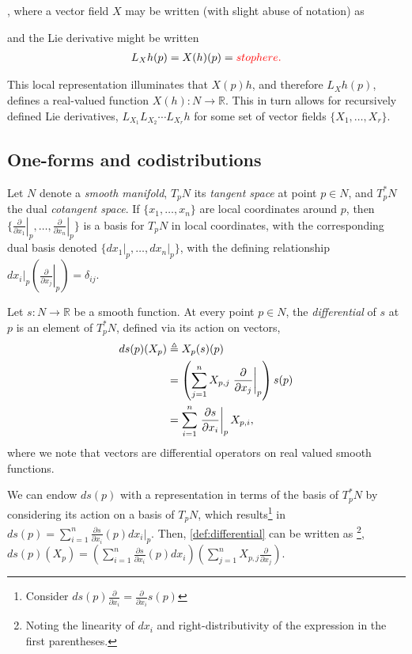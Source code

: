 \documentclass[psamsfonts]{amsart}
\theoremstyle{definition}
\theoremstyle{remark}
\newcommand*\R{\mathds{R}}
\newcommand*\isdefined{\triangleq}
\newcommand{\fracpartial}[2]{\frac{\partial #1}{\partial  #2}}
\numberwithin{equation}{section}
\begin{document}
, where a vector field $X$ may be written (with slight abuse of notation) as

 and the Lie derivative might be written 
\begin{align}
L_Xh(p) = X(h)(p) = {\color{red} stop here. }
\end{align}

This local representation illuminates that $X(p)h$, and therefore $L_Xh(p)$, defines a real-valued function $X(h):N\rightarrow \R$. This in turn allows for recursively defined Lie derivatives, $L_{X_{1}}L_{X_{2}}\cdots L_{X_{r}}h$ for some set of vector fields $\{X_1, \dots , X_r\}$.


\subsection{One-forms and codistributions}
Let $N$ denote a \textit{smooth manifold}, $T_pN $ its \textit{tangent space} at point $p \in N$, and $T^*_pN$ the dual \textit{cotangent space}. If $\{x_1, \dots, x_n\}$ are local coordinates around $p$, then
 $\{\left.\frac{\partial}{\partial x_1}\right\rvert_p,\dots, \left.\frac{\partial}{\partial x_n}\right\rvert_p \}$ is a basis for $T_pN$ in local coordinates, with the corresponding dual basis denoted $\{dx_1\vert_p, \dots, dx_n\vert_p\}$, with the defining relationship $dx_i\vert_p \left(\left.\frac{\partial}{\partial x_j}\right\rvert_p\right) = \delta_{ij}$. 
 
 Let $s: N \rightarrow \R$ be a smooth function. At every point $p \in N$, the \textit{differential} of $s$ at $p$ is an element of $T^*_pN$, defined via its action on vectors, 
\begin{align}
    ds(p)(X_p) & \isdefined X_p(s)(p) \label{def:differential} \\%
     & = \left(\sum_{j = 1}^nX_{p, j}\left.\frac{\partial}{\partial x_j}\right\rvert_p\right)s(p) \notag \\
     & = \sum_{i = 1}^n \left.\frac{\partial s}{\partial x_i} \right\rvert_p X_{p, i}, \notag
\end{align}
where we note that vectors are differential operators on real valued smooth functions. 


We can endow $ds(p)$ with a representation in terms of the basis of $T^*_pN$ by considering its action on a basis of $T_pN$, which results\footnote{{\color{red}Consider $ds(p)\fracpartial{ }{x_i} = \fracpartial{}{x_i}s(p)$ }} in $ds(p) =\sum_{i = 1}^n \frac{\partial s}{\partial x_i}(p)dx_i\vert_p$. Then, \eqref{def:differential} can be written as \footnote{Noting the linearity of $dx_i$ and right-distributivity of the expression in the first parentheses.}, $ds(p)(X_p) = \left(\sum_{i = 1}^n \frac{\partial s}{\partial x_i}(p)dx_i  \right)\left(\sum_{j = 1}^nX_{p, j}\frac{\partial}{\partial x_j}\right)$. 
\end{document}

